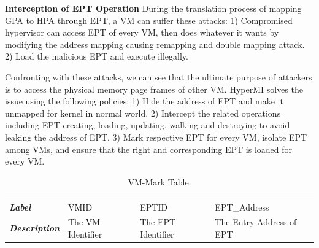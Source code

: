 \documentclass[conference]{IEEEtran}
\begin{document}
\textbf{Interception of EPT Operation }
During the translation process of mapping GPA to HPA through EPT, a VM can suffer these attacks: 1) Compromised hypervisor can access EPT of every VM, then does whatever it wants by modifying the address mapping causing remapping and double mapping attack. 2) Load the malicious EPT and execute illegally.

Confronting with these attacks, we can see that the ultimate purpose of attackers is to access the physical memory page frames of other VM. HyperMI solves the issue using the following policies: 1) Hide the address of EPT and make it unmapped for kernel in normal world. 2) Intercept the related operations including EPT creating, loading, updating, walking and destroying to avoid leaking the address of EPT. 3) Mark respective EPT for every VM, isolate EPT among VMs, and ensure that the right and corresponding EPT is loaded for every VM.




\begin{table}[htbp]
\centering
\caption{VM-Mark Table.}\label{tab1}
\begin{tabular}{p{1.4cm}|p{1.2cm}|p{1.1cm}|p{1.7cm}}
\hline
\multicolumn{4}{c}{\bfseries\textbf\centering{VM-Mark Table}}\\
\hline
{\itshape\bfseries Label} & VMID & EPTID & EPT\_Address\\
\hline
{\itshape\bfseries Description} & { The VM Identifier} & The EPT Identifier & The Entry Address of EPT\\
\hline
\end{tabular}
\end{table}
\end{document}
